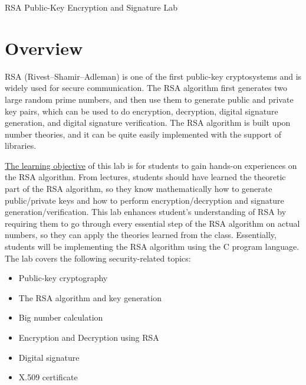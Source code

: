 






\begin{center}
{\LARGE RSA Public-Key Encryption and Signature Lab}
\end{center}




\section{Overview}

RSA (Rivest–Shamir–Adleman) is one of the first public-key cryptosystems
and is widely used for secure communication. 
The RSA algorithm first generates two large random prime numbers, 
and then use them to generate public and private key pairs, which can be
used to do encryption, decryption, digital signature generation, 
and digital signature verification. The RSA algorithm is built upon 
number theories, and it can be quite easily implemented with the support of
libraries. 


\underline{The learning objective} of this lab is for students to gain hands-on experiences on
the RSA algorithm. From lectures, students should have learned the 
theoretic part of the RSA algorithm, so they know 
mathematically how to generate public/private keys and 
how to perform encryption/decryption and signature generation/verification. 
This lab enhances student's understanding of RSA 
by requiring them to go through every essential step of the RSA algorithm
on actual numbers, so they can apply the theories learned from the class. 
Essentially, students will be implementing the RSA algorithm using 
the C program language. The lab covers the following security-related topics:

\begin{itemize}[noitemsep]
\item Public-key cryptography
\item The RSA algorithm and key generation
\item Big number calculation
\item Encryption and Decryption using RSA 
\item Digital signature
\item X.509 certificate
\end{itemize}



